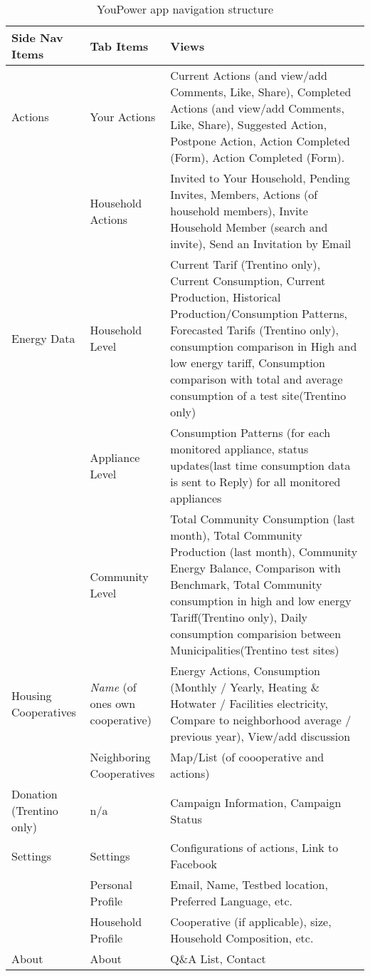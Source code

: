 {
\footnotesize 
\begin{longtable}{ l l p{6cm}}
\caption{YouPower app navigation structure}\label{tab:app_nav}\\
\hline
\textbf{Side Nav Items}  &
\textbf{Tab Items}  &
\textbf{Views}  \\ \hline

Actions & Your Actions & Current Actions (and view/add Comments, Like, Share), Completed Actions (and view/add Comments, Like, Share), Suggested Action, Postpone Action, Action Completed (Form), Action Completed (Form).\\ \cline{2-3}
& Household Actions & Invited to Your Household, Pending Invites, Members, Actions (of household members), Invite Household Member (search and invite), Send an Invitation by Email \\ 
\hline

Energy Data  & Household Level  & Current Tarif (Trentino only), Current Consumption, Current Production, Historical Production/Consumption Patterns, Forecasted Tarifs (Trentino only), consumption comparison in High and low energy tariff, Consumption comparison with total and average consumption of a test site(Trentino only) \\  \cline{2-3}
& Appliance Level & Consumption Patterns (for each monitored appliance, status updates(last time consumption data is sent to Reply) for all monitored appliances\\  \cline{2-3}
&  Community Level & Total Community Consumption (last month), Total Community Production (last month), Community Energy Balance, Comparison with Benchmark, Total Community consumption in high and low energy Tariff(Trentino only), Daily consumption comparision between Municipalities(Trentino test sites)\\  \hline

Housing Cooperatives & \textit{Name} (of ones own cooperative) & Energy Actions, Consumption (Monthly / Yearly, Heating \& Hotwater / Facilities electricity, Compare to neighborhood average / previous year), View/add discussion \\ \cline{2-3}
& Neighboring Cooperatives &  Map/List (of coooperative and actions) \\  \hline

Donation (Trentino only) & n/a & Campaign Information, Campaign Status \\
\hline

Settings & Settings & Configurations of actions, Link to Facebook \\ 
& Personal Profile & Email, Name, Testbed location, Preferred Language, etc.  \\ 
& Household Profile & Cooperative (if applicable), size, Household Composition, etc.\\  \hline

About & About & Q\&A List, Contact\\ \hline
\end{longtable}
} 

% 

